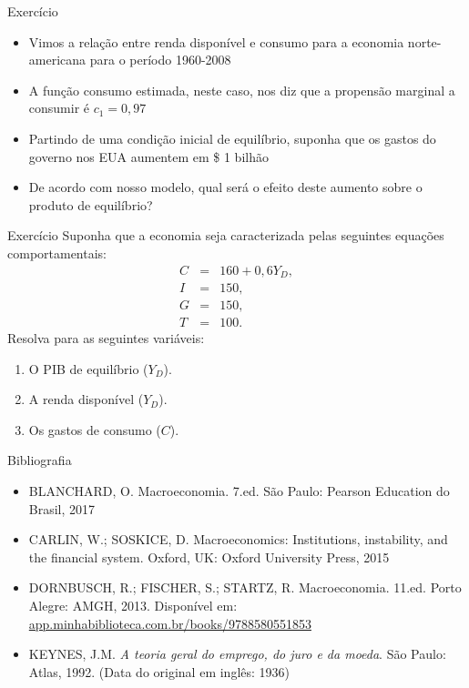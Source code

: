 \documentclass[10pt]{beamer}
\begin{document}
\begin{frame}{Exercício}
    \begin{itemize}
        \item Vimos a relação entre renda disponível e consumo para a economia norte-americana para o período 1960-2008\bigskip
         
        \item A função consumo estimada, neste caso, nos diz que a propensão marginal a consumir é $c_1 = 0,97$\bigskip
         
        \item Partindo de uma condição inicial de equilíbrio, suponha que os gastos do governo nos EUA aumentem em \$ 1 bilhão\bigskip
         
        \item De acordo com nosso modelo, qual será o efeito deste aumento sobre o produto de equilíbrio?
    \end{itemize}
\end{frame}

\begin{frame}{Exercício}
    Suponha que a economia seja caracterizada pelas seguintes equações comportamentais:
    \begin{eqnarray}
    C &=& 160 + 0,6Y_D, \nonumber \\
    I &=& 150, \nonumber \\
    G &=& 150, \nonumber \\
    T &=& 100. \nonumber
    \end{eqnarray}
    Resolva para as seguintes variáveis:
    \begin{enumerate}
        \item O PIB de equilíbrio ($Y_D$).
         
        \item A renda disponível ($Y_D$).
         
        \item Os gastos de consumo ($C$).
    \end{enumerate}
\end{frame}

\begin{frame}{ Bibliografia}
    \begin{itemize}
        \item BLANCHARD, O. Macroeconomia. 7.ed. São Paulo: Pearson Education do Brasil, 2017\medskip
        \item CARLIN, W.; SOSKICE, D. Macroeconomics: Institutions, instability, and the financial system. Oxford, UK: Oxford University Press, 2015\medskip
        \item DORNBUSCH, R.; FISCHER, S.; STARTZ, R. Macroeconomia. 11.ed. Porto Alegre: AMGH, 2013. Disponível em: \href{https://app.minhabiblioteca.com.br/books/9788580551853}{app.minhabiblioteca.com.br/books/9788580551853}\medskip
        \item KEYNES, J.M. \emph{A teoria geral do emprego, do juro e da moeda}. São Paulo: Atlas, 1992. (Data do original em inglês: 1936)\medskip        
    \end{itemize}
\end{frame}
\end{document}

